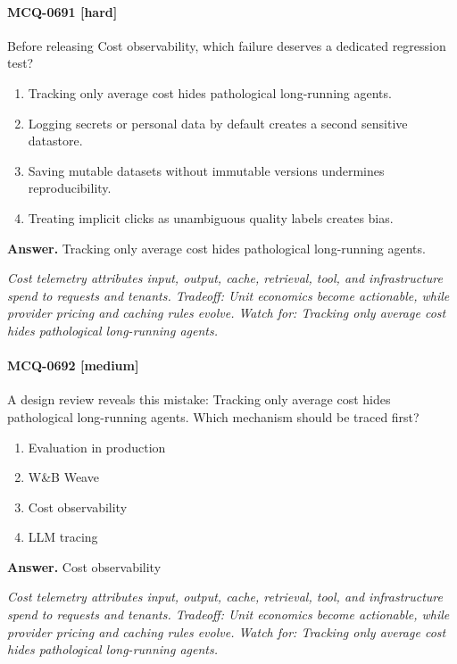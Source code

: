 \paragraph{MCQ-0691 [hard]} Before releasing Cost observability, which failure deserves a dedicated regression test?
\begin{enumerate}[label=\Alph*.]
\item Tracking only average cost hides pathological long-running agents.
\item Logging secrets or personal data by default creates a second sensitive datastore.
\item Saving mutable datasets without immutable versions undermines reproducibility.
\item Treating implicit clicks as unambiguous quality labels creates bias.
\end{enumerate}
\noindent\textbf{Answer.} Tracking only average cost hides pathological long-running agents.
\par\textit{Cost telemetry attributes input, output, cache, retrieval, tool, and infrastructure spend to requests and tenants. Tradeoff: Unit economics become actionable, while provider pricing and caching rules evolve. Watch for: Tracking only average cost hides pathological long-running agents.}
\paragraph{MCQ-0692 [medium]} A design review reveals this mistake: Tracking only average cost hides pathological long-running agents. Which mechanism should be traced first?
\begin{enumerate}[label=\Alph*.]
\item Evaluation in production
\item W\&B Weave
\item Cost observability
\item LLM tracing
\end{enumerate}
\noindent\textbf{Answer.} Cost observability
\par\textit{Cost telemetry attributes input, output, cache, retrieval, tool, and infrastructure spend to requests and tenants. Tradeoff: Unit economics become actionable, while provider pricing and caching rules evolve. Watch for: Tracking only average cost hides pathological long-running agents.}
